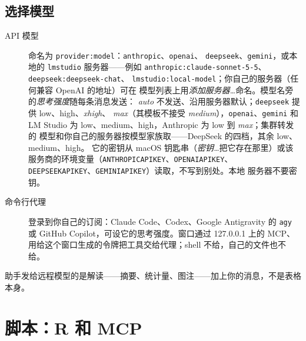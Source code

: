 \documentclass[11pt]{ctexrep}
\newcommand{\codeunderscore}{\textunderscore\allowbreak}
\newcommand{\code}[1]{\texttt{\let\_\codeunderscore #1}}
\begin{document}
\section{选择模型}
\begin{description}
  \item[API 模型] 命名为 \code{provider:model}：\code{anthropic}、\code{openai}、
        \code{deepseek}、\code{gemini}，或本地的 \code{lmstudio} 服务器——例如
        \code{anthropic:claude-sonnet-5-5}、\code{deepseek:deepseek-chat}、
        \code{lmstudio:local-model}；你自己的服务器（任何兼容 OpenAI 的地址）可在
        模型列表上用\emph{添加服务器…}命名。模型名旁的\emph{思考强度}随每条消息发送：
        \emph{auto} 不发送、沿用服务器默认；\code{deepseek} 提供 low、high、\emph{xhigh}、
        \emph{max}（其模板不接受 \emph{medium}），\code{openai}、\code{gemini} 和
        LM Studio 为 low、medium、high，Anthropic 为 low 到 \emph{max}；集群转发的
        模型和你自己的服务器按模型家族取——DeepSeek 的四档，其余 low、medium、high。
        它的密钥从 macOS 钥匙串（\emph{密钥…}把它存在那里）或该
        服务商的环境变量（\code{ANTHROPIC\_API\_KEY}、\code{OPENAI\_API\_KEY}、
        \code{DEEPSEEK\_API\_KEY}、\code{GEMINI\_API\_KEY}）读取，不写到别处。本地
        服务器不要密钥。
  \item[命令行代理] 登录到你自己的订阅：Claude Code、Codex、Google Antigravity 的
        \code{agy} 或 GitHub Copilot，可设它的思考强度。窗口通过 127.0.0.1 上的 MCP、
        用给这个窗口生成的令牌把工具交给代理；shell 不给，自己的文件也不给。
\end{description}
助手发给远程模型的是解读——摘要、统计量、图注——加上你的消息，不是表格本身。

\chapter{脚本：R 和 MCP}\label{ch:script}
\end{document}
